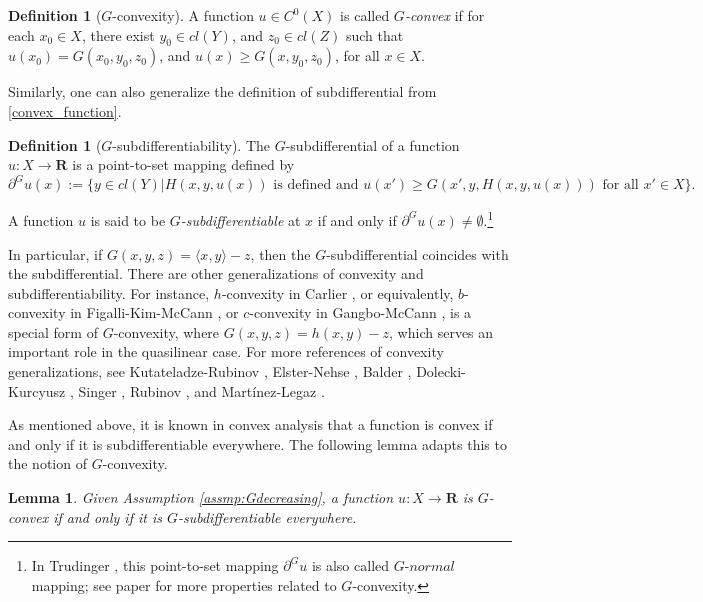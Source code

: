 \documentclass[a4paper, 11pt]{amsart}
\numberwithin{equation}{section}
\theoremstyle{plain}
\newtheorem{lemma}[theorem]{Lemma}
\theoremstyle{definition}
\newtheorem{definition}[theorem]{Definition}
\theoremstyle{remark}
\newcommand{\R}{\mathbf{R}}
\begin{document}
\begin{definition}[$G$-convexity]
	A function $u\in C^0(X)$ is called {\it $G$-convex} if for each $x_0 \in X$, there exist $y_0 \in   cl(Y)$, and $z_0 \in  cl(Z)$ such that $u(x_0)=G(x_0, y_0, z_0)$, and $u(x)\ge G(x, y_0, z_0)$, for all $x\in X$.
\end{definition}


Similarly, one can also generalize the definition of subdifferential from \eqref{convex_function}.

\begin{definition}[$G$-subdifferentiability]
	The $G$-subdifferential of a 
	function $u: X \longrightarrow \R$ is a point-to-set mapping defined by
	\begin{equation*}
	\partial^G u(x):= \{ y\in  cl(Y)| H(x,y,u(x)) \text{ is defined and }u(x')\ge G(x',y, H(x,y,u(x))) \text{ for all } x'\in X\}.
	\end{equation*}
	
	A function $u$ is said to be {\it $G$-subdifferentiable} at $x$ if and only if $\partial^G u(x) \neq \emptyset$.\footnote{In Trudinger \cite{Trudinger14}, this point-to-set mapping $\partial^G u$ is also called $G$-$normal$ mapping; see paper for more properties related to $G$-convexity.}
\end{definition}




In particular, if $G(x,y,z) = \langle x, y \rangle - z$, then the $G$-subdifferential coincides with the subdifferential. There are other generalizations of convexity and subdifferentiability. For instance, $h$-convexity in Carlier \cite{Carlier01}, or equivalently, $b$-convexity in Figalli-Kim-McCann \cite{FigalliKimMcCann11}, or $c$-convexity in  Gangbo-McCann \cite{GangboMcCann96}, is a special form of $G$-convexity, where $G(x,y,z)=  h(x,y) -z$, which serves an important role in the quasilinear case. For more references of convexity generalizations, see Kutateladze-Rubinov \cite{KutateladzeRubinov72}, Elster-Nehse \cite{ElsterNehse74}, Balder \cite{Balder77}, Dolecki-Kurcyusz \cite{DoleckiKurcyusz78},  Singer \cite{Singer97},  Rubinov \cite{Rubinov00a}, and Martínez-Legaz \cite{MartinezLegaz05}.\medskip


As mentioned above, it is known in convex analysis that a function is convex if and only if it is subdifferentiable everywhere. The following lemma adapts this to the notion of $G$-convexity. 

\begin{lemma}\label{convex-subdiff}
	Given Assumption \ref{assmp:Gdecreasing}, a function $u: X \longrightarrow \R$ is $G$-convex if and only if it is $G$-subdifferentiable everywhere.
\end{lemma}
\end{document}
